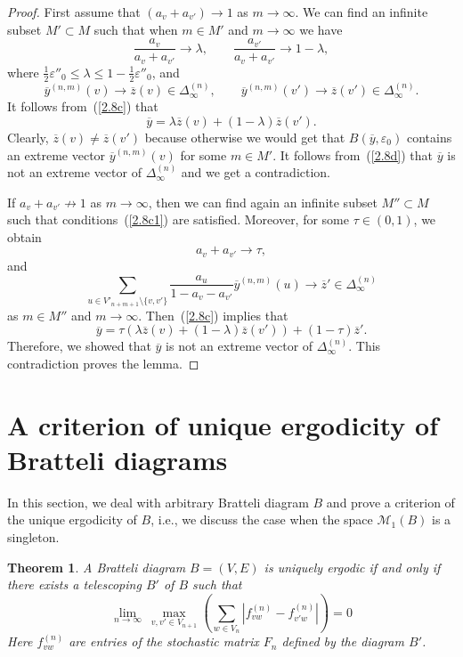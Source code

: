 \documentclass[11pt, english, reqno]{amsart}
\theoremstyle{definition}
\theoremstyle{remark}
\theoremstyle{plain}
\newtheorem{thm}[defin]{Theorem}
\def\ov{\overline}
\numberwithin{equation}{section}
\begin{document}
\begin{proof}
First assume that $(a_v + a_{v'}) \rightarrow 1$ as $m \rightarrow
\infty$. We can find an infinite subset $M' \subset M$ such that when $m
\in M'$ and $m \rightarrow \infty$ we have
\begin{equation}\label{2.8c1}
\frac{a_v}{a_v + a_{v'}} \rightarrow \lambda, \qquad  \frac{a_{v'}}{a_v +
 a_{v'}} \rightarrow 1 - \lambda,
\end{equation}
where $\frac{1}{2}\varepsilon''_0 \leq \lambda \leq 1 - \frac{1}{2}
\varepsilon''_0$, and
$$
\ov y^{(n,m)}(v) \rightarrow \ov z(v) \in \Delta_{\infty}^{(n)}, \qquad
\ov y^{(n,m)}(v') \rightarrow \ov z(v') \in \Delta_{\infty}^{(n)}.
$$
It follows from~(\ref{2.8c}) that
\begin{equation}\label{2.8d}
\ov y = \lambda \ov z(v) + (1-\lambda)\ov z(v').
\end{equation}
Clearly, $\ov z(v) \neq \ov z(v')$ because otherwise we would get that
$B(\ov y, \varepsilon_0)$ contains an extreme vector $\ov y^{(n,m)}(v)$ for some
$m \in M'$. It follows from~(\ref{2.8d}) that $\ov y$ is not an extreme vector of
$\Delta_{\infty}^{(n)}$ and we get a contradiction.

If $a_v + a_{v'} \nrightarrow 1$ as $m\to \infty$, then we can find again
 an infinite subset $M'' \subset M$ such that conditions~(\ref{2.8c1}) are
 satisfied. Moreover,  for some $\tau\in (0, 1)$, we obtain
$$
a_v + a_{v'} \rightarrow \tau,
$$
and
$$
\sum_{u \in  V'_{n+m+1} \setminus \{v,v'\}} \frac{a_u}{1 - a_v - a_{v'}}
\ov y^{(n,m)}(u) \rightarrow \ov z' \in \Delta^{(n)}_{\infty}
$$
as $m \in M''$ and $m \rightarrow \infty$. Then~(\ref{2.8c}) implies that
$$
\ov y = \tau(\lambda \ov z(v) + (1-\lambda)\ov z(v')) + (1 - \tau)\ov z'.
$$
Therefore, we showed that $\ov y$ is not an extreme vector
of $\Delta_{\infty}^{(n)}$. This contradiction proves the lemma.
\end{proof}

\section{A criterion of unique ergodicity of Bratteli diagrams} \label{Section 3}

In this section, we deal with arbitrary Bratteli diagram $B$ and prove  a
 criterion of the unique ergodicity of $B$, i.e., we discuss the case when
 the space $\mathcal M_1(B)$ is a singleton.

\begin{thm}\label{uniq_erg} %
A Bratteli diagram $B = (V,E)$ is uniquely ergodic if and only if there exists a telescoping $B'$ of $B$ such that
\begin{equation}\label{2.3b}
\lim_{n\to \infty}\ \max_{v, v' \in V_{n+1}} \left(\sum_{w \in V_n}
\left|f_{vw}^{(n)} - f_{v'w}^{(n)}\right| \right) = 0 %
\end{equation}
Here $f_{vw}^{(n)}$ are entries of
 the stochastic matrix $F_n$ defined by the diagram $B'$.

\end{thm}
\end{document}
